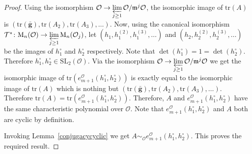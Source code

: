 \documentclass[10pt,twoside]{amsart}
\newcommand{\SL}{\mathrm{SL}}
\newcommand{\tr}{\mathrm{tr}}
\newcommand{\M}{\mathrm{M}}
\theoremstyle{definition}
\theoremstyle{definition}
\begin{document}
\begin{proof}
Using the isomorphism $\mathcal{O} \rightarrow \varprojlim\limits_{j\geq 1} \mathcal{O}/\mathfrak{m}^j\mathcal{O}$, the isomorphic image of $\tr(A)$ is $(\tr(\mathbf{\bar g}), \tr(A_2), \tr(A_3), \ldots)$. Now, using the canonical isomorphism $\mathcal{T^*} \colon  \M_n(\mathcal{O}) \rightarrow \varprojlim\limits _{j\geq 1}\M_n(\mathcal{O}_j)$, let  $(h_1, h_1^{(2)}, h_1^{(3)}, \ldots)$ and $(h_2, h_2^{(2)}, h_2^{(3)}, \ldots)$ be the images of ${h}^{\circ}_1$ and $h^{\circ}_2$ respectively. Note that $\det(h^{\circ}_1) = 1 =\det(h^{\circ}_2)$. Therefore $h^{\circ}_1, h^{\circ}_2\in \SL_2(\mathcal{O})$. Via the isomorphism $\mathcal{O} \rightarrow \varprojlim\limits_{j\geq 1} \mathcal{O}/ \mathfrak{m}^j\mathcal{O}$ we get the isomorphic image of  $\tr(e_{m+1}^{\mathcal{O}}(h^{\circ}_1, h^{\circ}_2))$ is exactly equal to the isomorphic image of $\tr(A)$ which is nothing but $(\tr(\mathbf{\bar g}), \tr(A_2), \tr(A_3), \ldots)$. Therefore $\tr(A) = \tr(e_{m+1}^{\mathcal{O}}(h^{\circ}_1, h^{\circ}_2))$. Therefore, $A$ and $e_{m+1}^{\mathcal{O}}(h^{\circ}_1, h^{\circ}_2)$ have the same characteristic polynomial over $\mathcal{O}$. Note that $e_{m+1}^{\mathcal{O}}(h^{\circ}_1, h^{\circ}_2)$ and $A$ both are cyclic by definition. 

Invoking Lemma~\ref{conjugacycyclic} we get
 $A\sim _{\mathcal{O}}e_{m+1}^{\mathcal{O}}(h^{\circ}_1, h^{\circ}_2)$. This proves the required result.
\end{proof}
\end{document}
